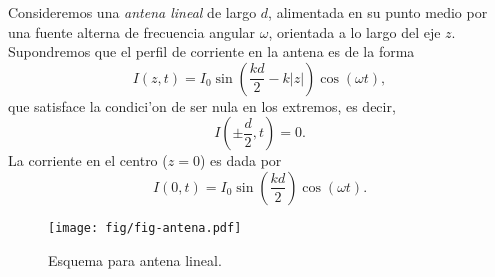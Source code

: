 Consideremos una \textit{antena lineal} de largo $d$, alimentada en su punto medio por una fuente alterna de frecuencia angular $\omega$, orientada a lo largo del eje $z$. Supondremos que el perfil de corriente en la antena es de la forma
\begin{equation}
 I(z,t)=I_0\sin\left(\frac{kd}{2}-k|z|\right)\cos(\omega t),
\end{equation}
que satisface la condici'on de ser nula en los extremos, es decir,
\begin{equation}
 I\left(\pm \frac{d}{2},t\right)=0.
\end{equation}
La corriente en el centro ($z=0$) es dada por
\begin{equation}
 I(0,t)=I_0\sin\left(\frac{kd}{2}\right)\cos(\omega t).
\end{equation}

\begin{figure}[H]
\centerline{\texttt{[image: fig/fig-antena.pdf]}}
 \caption{Esquema para antena lineal.}
\label{fig:antena}
\end{figure}

